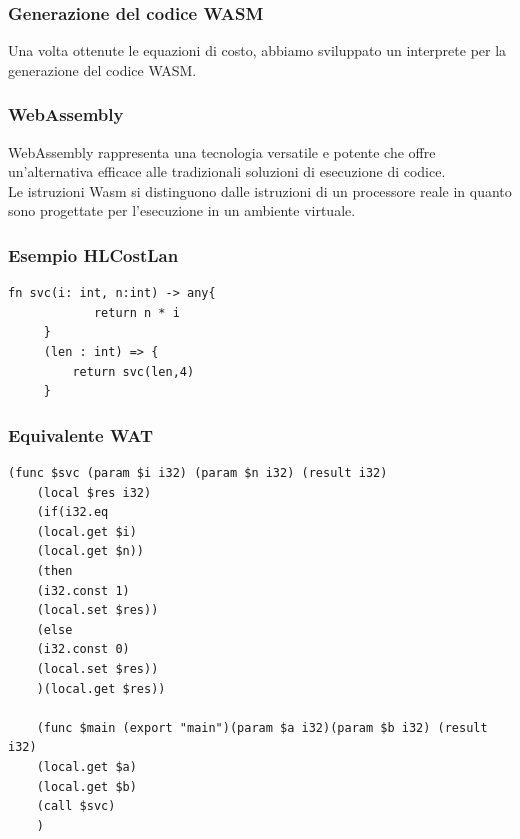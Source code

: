 \documentclass[xcolor=dvipsnames]{beamer}
\begin{document}
\begin{frame}
    \frametitle{Generazione del codice WASM}
    Una volta ottenute le equazioni di costo, abbiamo sviluppato un interprete per la generazione del codice WASM.\\

\end{frame}
\begin{frame}
    \frametitle{WebAssembly}
    \alert{WebAssembly} rappresenta una tecnologia versatile e potente che offre un'alternativa efficace alle tradizionali soluzioni di esecuzione di codice.\\
    Le istruzioni \alert{Wasm} si distinguono dalle istruzioni di un processore reale in quanto sono progettate per l'esecuzione in un ambiente virtuale.

\end{frame}
\begin{frame}[fragile]
    \frametitle{Esempio HLCostLan}
    \begin{lstlisting}[language=HLCostLan, caption={Esempio di funzione HLCostLan, Listing15}]
    fn svc(i: int, n:int) -> any{
            return n * i
     }
     (len : int) => {
         return svc(len,4)
     }
    \end{lstlisting}
\end{frame}
\begin{frame}[fragile]
    \frametitle{Equivalente WAT}
    \thispagestyle{empty}
        \begin{lstlisting}[language=WebAssembly]
    (func $svc (param $i i32) (param $n i32) (result i32)
    (local $res i32)
    (if(i32.eq
    (local.get $i)
    (local.get $n))
    (then
    (i32.const 1)
    (local.set $res))
    (else
    (i32.const 0)
    (local.set $res))
    )(local.get $res))

    (func $main (export "main")(param $a i32)(param $b i32) (result i32)
    (local.get $a)
    (local.get $b)
    (call $svc)
    )
        \end{lstlisting}
\end{frame}
\end{document}
